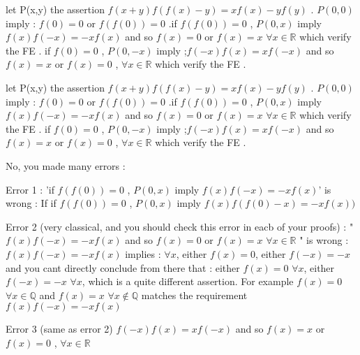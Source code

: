 \begin{solution}
	let P(x,y) the assertion $f(x+y)f(f(x)-y)=xf(x)-yf(y)$ . $P(0,0)$ imply : $f(0)=0$ or $f(f(0))=0$ .if $f(f(0))=0$ , $P(0,x)$ imply $f(x)f(-x)=-xf(x)$ and so $f(x)=0$ or $f(x)=x$ $\forall{x\in{\mathbb{R}}}$  which verify the FE . if $f(0)=0$ , $P(0,-x)$ imply ;$f(-x)f(x)=xf(-x)$ and so $f(x)=x$ or $f(x)=0$ , $\forall{x\in{\mathbb{R}}}$ which verify the FE .
\end{solution}



\begin{solution}
	\begin{tcolorbox}let P(x,y) the assertion $f(x+y)f(f(x)-y)=xf(x)-yf(y)$ . $P(0,0)$ imply : $f(0)=0$ or $f(f(0))=0$ .if $f(f(0))=0$ , $P(0,x)$ imply $f(x)f(-x)=-xf(x)$ and so $f(x)=0$ or $f(x)=x$ $\forall{x\in{\mathbb{R}}}$  which verify the FE . if $f(0)=0$ , $P(0,-x)$ imply ;$f(-x)f(x)=xf(-x)$ and so $f(x)=x$ or $f(x)=0$ , $\forall{x\in{\mathbb{R}}}$ which verify the FE .\end{tcolorbox}
No, you made many errors :

Error 1 : 
'if $f(f(0))=0$ , $P(0,x)$ imply $f(x)f(-x)=-xf(x)$' is wrong : If if $f(f(0))=0$ , $P(0,x)$ imply $f(x)f(f(0)-x)=-xf(x))$

Error 2 (very classical, and you should check this error in eacb of your proofs) :
"$f(x)f(-x)=-xf(x)$ and so $f(x)=0$ or $f(x)=x$ $\forall{x\in{\mathbb{R}}}$ " is wrong :
$f(x)f(-x)=-xf(x)$ implies : $\forall x$, either $f(x)=0$, either $f(-x)=-x$  and you cant directly conclude from there that :
either $f(x)=0$ $\forall x$, either $f(-x)=-x$ $\forall x$, which is a quite different assertion.
For example $f(x)=0$ $\forall x\in\mathbb Q$ and $f(x)=x$ $\forall x\notin\mathbb Q$ matches the requirement $f(x)f(-x)=-xf(x)$

Error 3  (same as error 2)
$f(-x)f(x)=xf(-x)$ and so $f(x)=x$ or $f(x)=0$ , $\forall{x\in{\mathbb{R}}}$
\end{solution}



